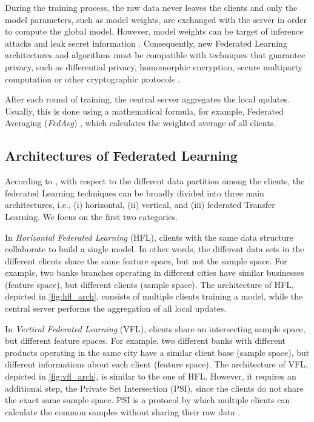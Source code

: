 During the training process, the raw data never leaves the clients and only the model parameters, such as model weights, are exchanged with the server in order to compute the global model. However, model weights can be target of inference attacks and leak secret information \cite{10.1145/3298981}.  Consequently, new Federated Learning architectures and algorithms must be compatible with techniques that guarantee privacy, such as differential privacy, homomorphic encryption, secure multiparty computation or other cryptographic protocols \cite{10.1145/3298981}.

After each round of training, the central server aggregates the local updates. Usually, this is done using a mathematical formula, for example, Federated Averaging (\textit{FedAvg}) \cite{10.48550/arxiv.1602.05629}, which calculates the weighted average of all clients.



\subsection{Architectures of Federated Learning}\label{background:archfl}

According to \cite{10.1145/3298981, 10.1145/3412357}, with respect to the different data partition among the clients, the federated Learning techniques can be broadly divided into three main architectures, i.e., (i) 
horizontal, (ii) vertical, and (iii) federated Transfer Learning. We focus on the first two categories.

In \textit{Horizontal Federated Learning} (HFL), clients with the same data structure collaborate to build a single model. In other words, the different data sets in the different clients share the same feature space, but not the sample space. For example, two banks branches operating in different cities have similar businesses (feature space), but different clients (sample space). The architecture of HFL, depicted in \autoref{fig:hfl_arch}, consists of multiple clients training a model, while the central server performs the aggregation of all local updates.

In \textit{Vertical Federated Learning} (VFL), clients share an intersecting sample space, but different feature spaces. For example, two different banks with different products operating in the same city have a similar client base (sample space), but different informations about each client (feature space). The architecture of VFL, depicted in \autoref{fig:vfl_arch}, is similar to the one of HFL. However, it requires an additional step, the Private Set Intersection (PSI), since the clients do not share the exact same sample space. PSI is a protocol by which multiple clients can calculate the common samples without sharing their raw data \cite{wei2022vertical}.

